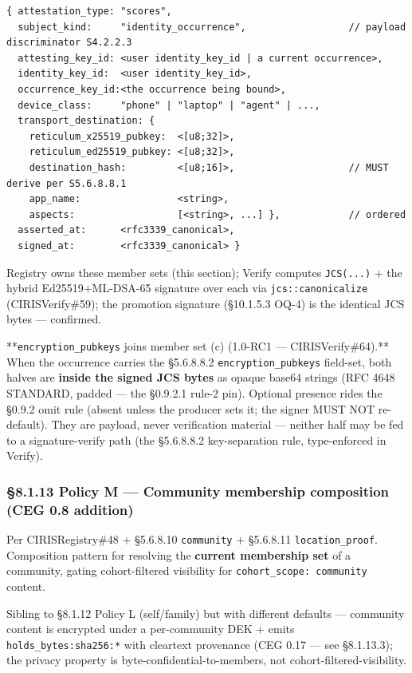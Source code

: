 \documentclass[11pt]{article}
\begin{document}
\begin{lstlisting}
{ attestation_type: "scores",
  subject_kind:     "identity_occurrence",                  // payload discriminator S4.2.2.3
  attesting_key_id: <user identity_key_id | a current occurrence>,
  identity_key_id:  <user identity_key_id>,
  occurrence_key_id:<the occurrence being bound>,
  device_class:     "phone" | "laptop" | "agent" | ...,
  transport_destination: {
    reticulum_x25519_pubkey:  <[u8;32]>,
    reticulum_ed25519_pubkey: <[u8;32]>,
    destination_hash:         <[u8;16]>,                    // MUST derive per S5.6.8.8.1
    app_name:                 <string>,
    aspects:                  [<string>, ...] },            // ordered
  asserted_at:      <rfc3339_canonical>,
  signed_at:        <rfc3339_canonical> }
\end{lstlisting}

Registry owns these member sets (this section); Verify computes \texttt{JCS(...)} + the hybrid Ed25519+ML-DSA-65 signature over each via \texttt{jcs::canonicalize} (CIRISVerify\#59); the promotion signature (§10.1.5.3 OQ-4) is the identical JCS bytes — confirmed.


**\texttt{encryption\_pubkeys} joins member set (c) (1.0-RC1 — CIRISVerify\#64).** When the occurrence carries the §5.6.8.8.2 \texttt{encryption\_pubkeys} field-set, both halves are \textbf{inside the signed JCS bytes} as opaque base64 strings (RFC 4648 STANDARD, padded — the §0.9.2.1 rule-2 pin). Optional presence rides the §0.9.2 omit rule (absent unless the producer sets it; the signer MUST NOT re-default). They are payload, never verification material — neither half may be fed to a signature-verify path (the §5.6.8.8.2 key-separation rule, type-enforced in Verify).


\subsubsection*{§8.1.13 Policy M — Community membership composition (CEG 0.8 addition)}


Per CIRISRegistry\#48 + §5.6.8.10 \texttt{community} + §5.6.8.11 \texttt{location\_proof}. Composition pattern for resolving the \textbf{current membership set} of a community, gating cohort-filtered visibility for \texttt{cohort\_scope: community} content.


Sibling to §8.1.12 Policy L (self/family) but with different defaults — community content is encrypted under a per-community DEK + emits \texttt{holds\_bytes:sha256:*} with cleartext provenance (CEG 0.17 — see §8.1.13.3); the privacy property is byte-confidential-to-members, not cohort-filtered-visibility.
\end{document}
